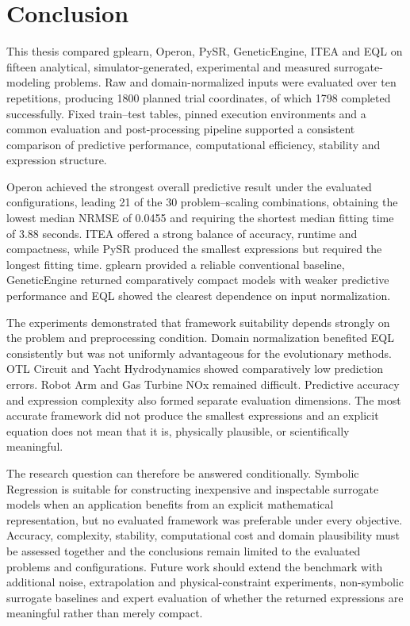 \documentclass[12pt,oneside,bibtotoc,liststotoc]{scrbook}
\begin{document}
\chapter{Conclusion}

This thesis compared gplearn, Operon, PySR, GeneticEngine, ITEA and EQL on fifteen analytical, simulator-generated, experimental and measured surrogate-modeling problems. Raw and domain-normalized inputs were evaluated over ten repetitions, producing 1800 planned trial coordinates, of which 1798 completed successfully. Fixed train--test tables, pinned execution environments and a common evaluation and post-processing pipeline supported a consistent comparison of predictive performance, computational efficiency, stability and expression structure.

Operon achieved the strongest overall predictive result under the evaluated configurations, leading 21 of the 30 problem--scaling combinations, obtaining the lowest median NRMSE of 0.0455 and requiring the shortest median fitting time of 3.88 seconds. ITEA offered a strong balance of accuracy, runtime and compactness, while PySR produced the smallest expressions but required the longest fitting time. gplearn provided a reliable conventional baseline, GeneticEngine returned comparatively compact models with weaker predictive performance and EQL showed the clearest dependence on input normalization.

The experiments demonstrated that framework suitability depends strongly on the problem and preprocessing condition. Domain normalization benefited EQL consistently but was not uniformly advantageous for the evolutionary methods. OTL Circuit and Yacht Hydrodynamics showed comparatively low prediction errors. Robot Arm and Gas Turbine NOx remained difficult. Predictive accuracy and expression complexity also formed separate evaluation dimensions. The most accurate framework did not produce the smallest expressions and an explicit equation does not mean that it is, physically plausible, or scientifically meaningful.

The research question can therefore be answered conditionally. Symbolic Regression is suitable for constructing inexpensive and inspectable surrogate models when an application benefits from an explicit mathematical representation, but no evaluated framework was preferable under every objective. Accuracy, complexity, stability, computational cost and domain plausibility must be assessed together and the conclusions remain limited to the evaluated problems and configurations. Future work should extend the benchmark with additional noise, extrapolation and physical-constraint experiments, non-symbolic surrogate baselines and expert evaluation of whether the returned expressions are meaningful rather than merely compact.

%
%


\end{document}
